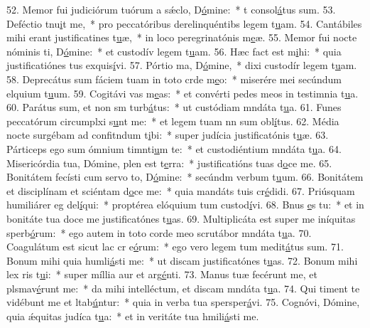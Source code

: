 52. Memor fui judiciórum tuórum a sǽclo, D\uline{ó}mine:~* t consol\uline{á}tus sum.
53. Deféctio tnu\uline{i}t me,~* pro peccatóribus derelinquéntibs legem t\uline{u}am.
54. Cantábiles mihi erant justificatines t\uline{u}æ,~* in loco peregrinatónis m\uline{e}æ.
55. Memor fui nocte nóminis ti, D\uline{ó}mine:~* et custodív legem t\uline{u}am.
56. Hæc fact est m\uline{i}hi:~* quia justificatiónes tus exquis\uline{í}vi.
57. Pórtio ma, D\uline{ó}mine,~* dixi custodír legem t\uline{u}am.
58. Deprecátus sum fáciem tuam in toto crde m\uline{e}o:~* miserére mei secúndum elquium t\uline{u}um.
59. Cogitávi vas m\uline{e}as:~* et convérti pedes meos in testimnia t\uline{u}a.
60. Parátus sum, et non sm turb\uline{á}tus:~* ut custódiam mndáta t\uline{u}a.
61. Funes peccatórum circumplxi s\uline{u}nt me:~* et legem tuam nn sum obl\uline{í}tus.
62. Média nocte surgébam ad confitndum t\uline{i}bi:~* super judícia justificatónis t\uline{u}æ.
63. Párticeps ego sum ómnium timnti\uline{u}m te:~* et custodiéntium mndáta t\uline{u}a.
64. Misericórdia tua, Dómine, plen est t\uline{e}rra:~* justificatións tuas d\uline{o}ce me.
65. Bonitátem fecísti cum servo to, D\uline{ó}mine:~* secúndm verbum t\uline{u}um.
66. Bonitátem et disciplínam et sciéntam d\uline{o}ce me:~* quia mandáts tuis cr\uline{é}didi.
67. Priúsquam humiliárer eg del\uline{í}qui:~* proptérea elóquium tum custod\uline{í}vi.
68. Bnus \uline{e}s tu:~* et in bonitáte tua doce me justificatónes t\uline{u}as.
69. Multiplicáta est super me iníquitas sperb\uline{ó}rum:~* ego autem in toto corde meo scrutábor mndáta t\uline{u}a.
70. Coagulátum est sicut lac cr e\uline{ó}rum:~* ego vero legem tum medit\uline{á}tus sum.
71. Bonum mihi quia humli\uline{á}sti me:~* ut discam justificatónes t\uline{u}as.
72. Bonum mihi lex ris t\uline{u}i:~* super míllia aur et arg\uline{é}nti.
73. Manus tuæ fecérunt me, et plsmav\uline{é}runt me:~* da mihi intelléctum, et discam mndáta t\uline{u}a.
74. Qui timent te vidébunt me et ltab\uline{ú}ntur:~* quia in verba tua spersper\uline{á}vi.
75. Cognóvi, Dómine, quia ǽquitas judíca t\uline{u}a:~* et in veritáte tua hmili\uline{á}sti me.
